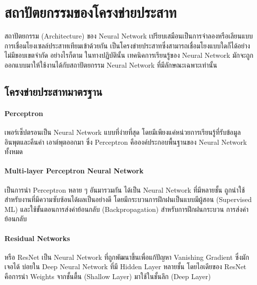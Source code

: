 \section{สถาปัตยกรรมของโครงข่ายประสาท}
\label{sec:arch_nn}

สถาปัตยกรรม (Architecture) ของ Neural Network เปรียบเสมือนเป็นการจำลองหรือเลียนแบบการเชื่อมโยงเซลล์ประสาทเทียมเข้าด้วยกัน%
เป็นโครงข่ายประสาทซึ่งสามารถเชื่อมโยงแบบใดก็ได้อย่างไม่มีขอบเขตจำกัด อย่างไรก็ตาม ในทางปฏิบัตินั้น เทคนิคการเรียนรู้ของ Neural Network 
มักจะถูกออกแบบมาให้ใช้งานได้กับสถาปัตยกรรม Neural Network ที่มีลักษณะเฉพาะเท่านั้น

\subsection{โครงข่ายประสาทมาตรฐาน}
\label{ssec:std_nn}

\paragraph{Perceptron} เพอร์เซ็ปตรอนเป็น Neural Network แบบที่ง่ายที่สุด โดยมีเพียงแค่หน่วยการเรียนรู้ที่รับข้อมูลอินพุตและคืนค่า%
เอาต์พุตออกมา ซึ่ง Perceptron คือองค์ประกอบพื้นฐานของ Neural Network ทั้งหมด

\paragraph{Multi-layer Perceptron Neural Network}
เป็นการนำ Perceptron หลาย ๆ อันมารวมกัน ได้เป็น Neural Network ที่มีหลายชั้น ถูกนำใช้สำหรับงานที่มีความซับซ้อนได้ผลเป็นอย่างดี 
โดยมีกระบวนการฝึกฝนเป็นแบบมีผู้สอน (Supervised ML) และใช้ขั้นตอนการส่งค่าย้อนกลับ (Backpropagation) สำหรับการฝึกฝนกระบวน%
การส่งค่าย้อนกลับ

\paragraph{Residual Networks} หรือ ResNet เป็น Neural Network ที่ถูกพัฒนาขึ้นเพื่อแก้ปัญหา Vanishing Gradient ซึ่งมักเจอได้%
บ่อยใน Deep Neural Network ที่มี Hidden Layer หลายชั้น โดยไอเดียของ ResNet คือการนำ Weights จากชั้นตื้น (Shallow Layer) 
มาใช้ในชั้นลึก (Deep Layer)

